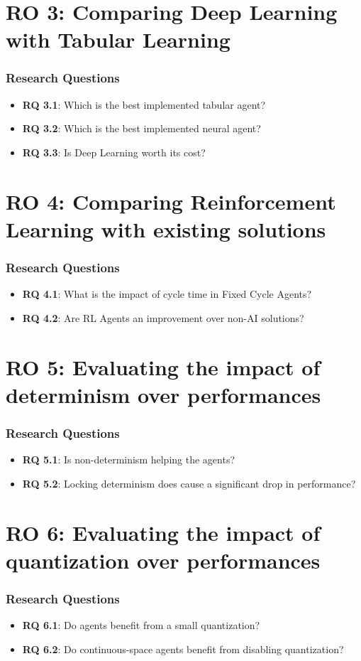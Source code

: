 \documentclass{beamer}
\begin{document}
\section{\textbf{RO 3}: Comparing Deep Learning with Tabular Learning}
\begin{frame}
\frametitle{Research Questions}
\begin{itemize}
\item \textbf{RQ 3.1}: Which is the best implemented tabular agent?
\item \textbf{RQ 3.2}: Which is the best implemented neural agent?
\item \textbf{RQ 3.3}: Is Deep Learning worth its cost?
\end{itemize}
\end{frame}

\section{\textbf{RO 4}: Comparing Reinforcement Learning with existing solutions}
\begin{frame}
\frametitle{Research Questions}
\begin{itemize}
\item \textbf{RQ 4.1}: What is the impact of cycle time in Fixed Cycle Agents?
\item \textbf{RQ 4.2}: Are RL Agents an improvement over non-AI solutions?
\end{itemize}
\end{frame}

\section{\textbf{RO 5}: Evaluating the impact of determinism over performances}
\begin{frame}
\frametitle{Research Questions}
\begin{itemize}
\item \textbf{RQ 5.1}: Is non-determinism helping the agents?
\item \textbf{RQ 5.2}: Locking determinism does cause a significant drop in performance?
\end{itemize}
\end{frame}

\section{\textbf{RO 6}: Evaluating the impact of quantization over performances}
\begin{frame}
\frametitle{Research Questions}
\begin{itemize}
\item \textbf{RQ 6.1}: Do agents benefit from a small quantization?
\item \textbf{RQ 6.2}: Do continuous-space agents benefit from disabling quantization?
\end{itemize}
\end{frame}
\end{document}
